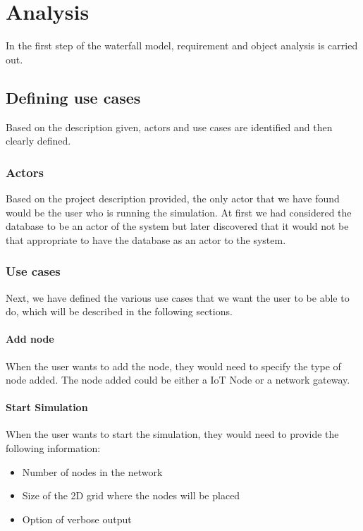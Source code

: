\chapter{Analysis}\label{ch:Analysis}

In the first step of the waterfall model, requirement and object analysis is carried out.

\section{Defining use cases}
Based on the description given, actors and use cases are identified and then clearly defined.

\subsection{Actors}
Based on the project description provided, the only actor that we have found would be the user who is running the simulation. At first we had considered the database to be an actor of the system but later discovered that it would not be that appropriate to have the database as an actor to the system.

\subsection{Use cases}
Next, we have defined the various use cases that we want the user to be able to do, which will be described in the following sections.

\subsubsection{Add node}
When the user wants to add the node, they would need to specify the type of node added. The node added could be either a IoT Node or a network gateway.

\subsubsection{Start Simulation}
When the user wants to start the simulation, they would need to provide the following information:
\begin{itemize}
  \item Number of nodes in the network
  \item Size of the 2D grid where the nodes will be placed
  \item Option of verbose output
\end{itemize}

